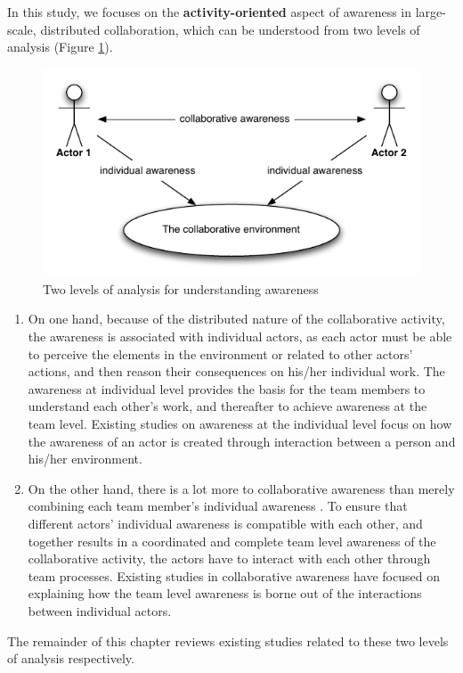 In this study, we focuses on the \textbf{activity-oriented} aspect of awareness in large-scale, distributed collaboration, which can be understood from two levels of analysis (Figure \ref{fig:two_levels_of_analysis}). 

\begin{figure}[htbp] %
   \centering
   \includegraphics{two_levels_of_analysis.pdf} 
   \caption{Two levels of analysis for understanding awareness}
   \label{fig:two_levels_of_analysis}
\end{figure}

\begin{enumerate}
   \item On one hand, because of the distributed nature of the collaborative activity, the awareness is associated with individual actors, as each actor must be able to perceive the elements in the environment or related to other actors' actions, and then reason their consequences on his/her individual work. The awareness at individual level provides the basis for the team members to understand each other's work, and thereafter to achieve awareness at the team level. Existing studies on awareness at the individual level focus on how the awareness of an actor is created through interaction between a person and his/her environment.
   \item On the other hand, there is a lot more to collaborative awareness than merely combining each team member's individual awareness \cite{salas1995situation}. To ensure that different actors' individual awareness is compatible with each other, and together results in a coordinated and complete team level awareness of the collaborative activity, the actors have to interact with each other through team processes. Existing studies in collaborative awareness have focused on explaining how the team level awareness is borne out of the interactions between individual actors. 
\end{enumerate}
The remainder of this chapter reviews existing studies related to these two levels of analysis respectively.


